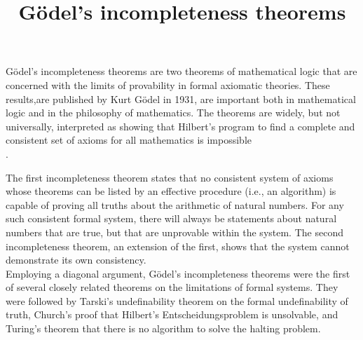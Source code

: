 \documentclass[10pts]{article}
\begin{document}
\title{Gödel's incompleteness theorems}

\maketitle


Gödel's incompleteness theorems are two theorems of mathematical logic that are concerned with the limits of provability in formal axiomatic theories. These results,are published by Kurt Gödel in 1931, are important both in mathematical logic and in the philosophy of mathematics. The theorems are widely, but not universally, interpreted as showing that Hilbert's program to find a complete and consistent set of axioms for all mathematics is impossible\\.

The first incompleteness theorem states that no consistent system of axioms whose theorems can be listed by an effective procedure (i.e., an algorithm) is capable of proving all truths about the arithmetic of natural numbers. For any such consistent formal system, there will always be statements about natural numbers that are true, but that are unprovable within the system. The second incompleteness theorem, an extension of the first, shows that the system cannot demonstrate its own consistency.\\

Employing a diagonal argument, Gödel's incompleteness theorems were the first of several closely related theorems on the limitations of formal systems. They were followed by Tarski's undefinability theorem on the formal undefinability of truth, Church's proof that Hilbert's Entscheidungsproblem is unsolvable, and Turing's theorem that there is no algorithm to solve the halting problem.\\
\end{document}
